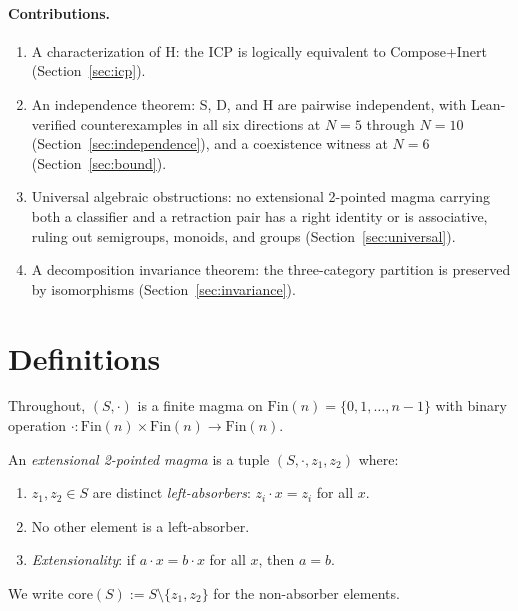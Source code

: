 \documentclass[sigconf,screen,review,anonymous]{acmart}
\newcommand{\dotop}{\cdot}
\newcommand{\Fin}{\mathrm{Fin}}
\newcommand{\core}{\mathrm{core}}
\begin{document}
\paragraph{Contributions.}
\begin{enumerate}
  \item A characterization of H: the ICP is logically equivalent to Compose+Inert (Section~\ref{sec:icp}).
  \item An independence theorem: S, D, and H are pairwise independent, with Lean-verified counterexamples in all six directions at $N\!=\!5$ through $N\!=\!10$ (Section~\ref{sec:independence}), and a coexistence witness at $N\!=\!6$ (Section~\ref{sec:bound}).
  \item Universal algebraic obstructions: no extensional 2-pointed magma carrying both a classifier and a retraction pair has a right identity or is associative, ruling out semigroups, monoids, and groups (Section~\ref{sec:universal}).
  \item A decomposition invariance theorem: the three-category partition is preserved by isomorphisms (Section~\ref{sec:invariance}).
\end{enumerate}

\section{Definitions}
\label{sec:definitions}

Throughout, $(S, \dotop)$ is a finite magma on $\Fin(n) = \{0, 1, \ldots, n-1\}$ with binary operation $\dotop : \Fin(n) \times \Fin(n) \to \Fin(n)$.

\begin{definition}
\label{def:epm}
An \emph{extensional 2-pointed magma} is a tuple $(S, \dotop, z_1, z_2)$ where:
\begin{enumerate}
  \item $z_1, z_2 \in S$ are distinct \emph{left-absorbers}: $z_i \dotop x = z_i$ for all $x$.
  \item No other element is a left-absorber.
  \item \emph{Extensionality}: if $a \dotop x = b \dotop x$ for all $x$, then $a = b$.
\end{enumerate}
We write $\core(S) := S \setminus \{z_1, z_2\}$ for the non-absorber elements.
\end{definition}
\end{document}
